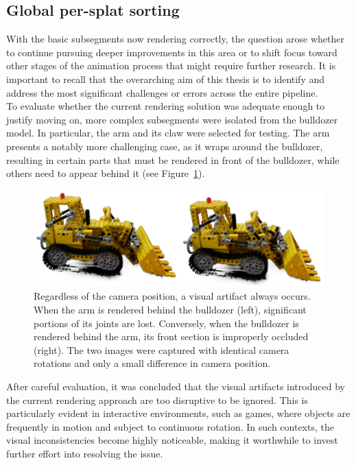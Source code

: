 \documentclass[12pt]{article}
\begin{document}
\subsection{Global per-splat sorting}
With the basic subsegments now rendering correctly, the question arose whether to continue pursuing deeper improvements in this area or to shift focus toward other stages of the animation process that might require further research. It is important to recall that the overarching aim of this thesis is to identify and address the most significant challenges or errors across the entire pipeline.\\
To evaluate whether the current rendering solution was adequate enough to justify moving on, more complex subsegments were isolated from the bulldozer model. In particular, the arm and its claw were selected for testing. The arm presents a notably more challenging case, as it wraps around the bulldozer, resulting in certain parts that must be rendered in front of the bulldozer, while others need to appear behind it (see Figure~\ref{fig:arm}).
\begin{figure}[h!]
	\centering
	\includegraphics[width=\textwidth]{Images/arm.png}
	\caption{Regardless of the camera position, a visual artifact always occurs. When the arm is rendered behind the bulldozer (left), significant portions of its joints are lost. Conversely, when the bulldozer is rendered behind the arm, its front section is improperly occluded (right). The two images were captured with identical camera rotations and only a small difference in camera position.}
	\label{fig:arm}
\end{figure}
\FloatBarrier
\noindent
After careful evaluation, it was concluded that the visual artifacts introduced by the current rendering approach are too disruptive to be ignored. This is particularly evident in interactive environments, such as games, where objects are frequently in motion and subject to continuous rotation. In such contexts, the visual inconsistencies become highly noticeable, making it worthwhile to invest further effort into resolving the issue.
\\\\
\end{document}

